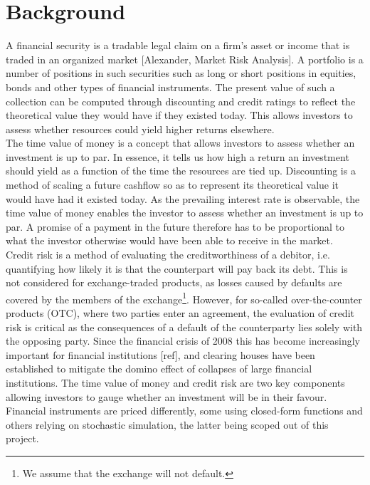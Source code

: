 \chapter{Background}

A financial security is a tradable legal claim on a firm's asset or income that
is traded in an organized market [Alexander, Market Risk Analysis]. A portfolio
is a number of positions in such securities such as long or short positions in equities, bonds and other types of financial instruments. The present value of such a collection can be computed through discounting and credit ratings to reflect the theoretical value they would have if they existed today. This allows investors to assess whether resources could yield higher returns elsewhere.\\

The time value of money is a concept that allows investors to assess whether an investment is up to par. In essence, it tells us how high a return an investment should yield as a function of the time the resources are tied up.
Discounting is a method of scaling a future cashflow so as to represent its theoretical value it would have had it existed today.
As the prevailing interest rate is observable, the time value of money enables the investor to assess whether an investment is up to par. A promise of a payment in the future therefore has to be proportional to what the investor otherwise would have been able to receive in the market.\\

Credit risk is a method of evaluating the creditworthiness of a debitor, i.e. quantifying how likely it is that the counterpart will pay back its debt. This is not considered for exchange-traded products, as losses caused by defaults are covered by the members of the exchange\footnote{We assume that the exchange will not default.}. However, for so-called over-the-counter products (OTC), where two parties enter an agreement, the evaluation of credit risk is critical as the consequences of a default of the counterparty lies solely with the opposing party. Since the financial crisis of 2008 this has become increasingly important for financial institutions [ref], and clearing houses have been established to mitigate the domino effect of collapses of large financial institutions.
The time value of money and credit risk are two key components allowing investors to gauge whether an investment will be in their favour.\\

Financial instruments are priced differently, some using closed-form functions and others relying on stochastic simulation, the latter being scoped out of this project.

